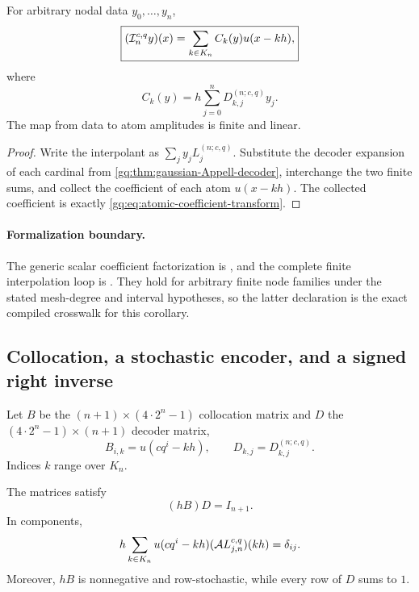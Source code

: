 \begin{corollary}
\label{gq:cor:interpolation-up-factorization}
For arbitrary nodal data $y_0,\ldots,y_n$,
\begin{equation}
 \boxed{
 (\mathcal I_n^{c,q}y)(x)
 =\sum_{k\in K_n}C_k(y)u(x-kh),}
 \label{gq:eq:interpolation-up-factorization}
\end{equation}
where
\begin{equation}
 C_k(y)=h\sum_{j=0}^{n}D_{k,j}^{(n;c,q)}y_j.
 \label{gq:eq:atomic-coefficient-transform}
\end{equation}
The map from data to atom amplitudes is finite and linear.
\end{corollary}

\begin{proof}
Write the interpolant as $\sum_jy_jL_j^{(n;c,q)}$.  Substitute the
decoder expansion of each cardinal from
\cref{gq:thm:gaussian-Appell-decoder}, interchange the two finite sums,
and collect the coefficient of each atom $u(x-kh)$.  The collected
coefficient is exactly \eqref{gq:eq:atomic-coefficient-transform}.
\end{proof}

\paragraph{Formalization boundary.}
The generic scalar coefficient factorization is
, and the
complete finite interpolation loop is
.
They hold for arbitrary finite node families under the stated mesh-degree and
interval hypotheses, so the latter declaration is the exact compiled
crosswalk for this corollary.

\subsection{Collocation, a stochastic encoder, and a signed right inverse}

Let $B$ be the $(n+1)\times(4\cdot2^n-1)$ collocation matrix and $D$ the
$(4\cdot2^n-1)\times(n+1)$ decoder matrix,
\begin{equation}
 B_{i,k}=u(cq^i-kh),
 \qquad
 D_{k,j}=D_{k,j}^{(n;c,q)}.
 \label{gq:eq:BD-definition}
\end{equation}
Indices $k$ range over $K_n$.

\begin{theorem}
\label{gq:thm:gaussian-Appell-biorthogonality}
The matrices satisfy
\begin{equation}
 \boxed{(hB)D=I_{n+1}.}
 \label{gq:eq:stochastic-right-inverse}
\end{equation}
In components,
\begin{equation}
 h\sum_{k\in K_n}
 u(cq^i-kh)(\mathcal A L_{j,n}^{c,q})(kh)=\delta_{ij}.
 \label{gq:eq:gaussian-Appell-biorthogonality}
\end{equation}
Moreover, $hB$ is nonnegative and row-stochastic, while every row of $D$
sums to $1$.
\end{theorem}


